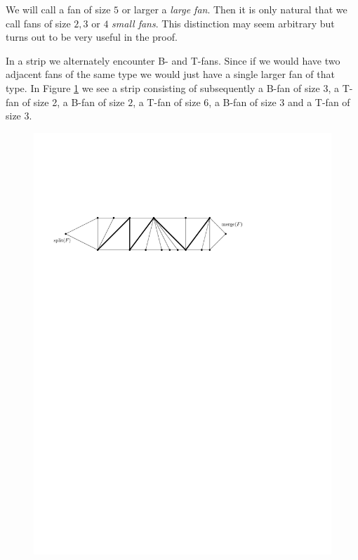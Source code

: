  We will call a fan of size $5$ or larger a \emph{large fan}. Then it is only natural that we call fans of size $2, 3$ or $4$ \emph{small fans}. This distinction may seem arbitrary but turns out to be very useful in the proof.


 In a strip we alternately encounter B- and T-fans. Since if we would have two adjacent fans of the same type we would just have a single larger fan of that type.
 In Figure \ref{fig:uni:fans} we see a strip consisting of subsequently a B-fan of size $3$, a T-fan of size 2, a B-fan of size $2$, a T-fan of size $6$, a B-fan of size $3$ and a T-fan of size $3$.

 \begin{figure}[h]
   \centering
   \includegraphics[scale=.9]{unifiedAlgo/img/fans}
   \caption{}
   \label{fig:uni:fans}
 \end{figure}



